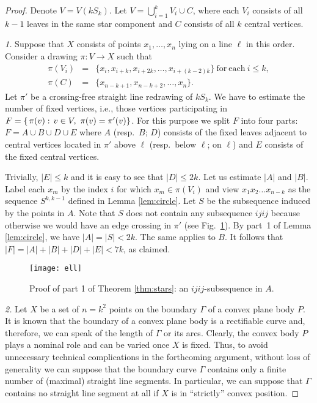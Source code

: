 \documentclass[reqno,12pt]{amsart}
\newcounter{claim}
\newcommand{\function}[2]{:#1 \rightarrow #2}
\begin{document}
\begin{proof}
Denote $V=V(kS_k)$.
Let $V=\bigcup_{i=1}^kV_i\cup C$, where each $V_i$ consists of all $k-1$ leaves
in the same star component and $C$ consists of all $k$ central vertices.

{\sl 1.}
Suppose that $X$ consists of points $x_1,\ldots,x_n$ lying on a line $\ell$ in this order.
Consider a drawing $\pi\function VX$ such that
\begin{equation}\label{eq:pi}
\begin{array}{rcl}
\pi(V_i)&=&\{x_i,x_{i+k},x_{i+2k},\ldots,x_{i+(k-2)k}\}\mathrm{\ for\ each\ }i\le k,\\
\pi(C)&=&\{x_{n-k+1},x_{n-k+2},\ldots,x_n\}.
\end{array}
\end{equation}
Let $\pi'$ be a crossing-free straight line redrawing of $kS_k$.
We have to estimate the number of fixed vertices, i.e., those vertices
participating in 
$F=\{ \hspace{0.5mm} \pi(v) : \hspace{0.5mm} v\in V,\ \pi(v)=\pi'(v)\}$.
For this purpose we split $F$ into four parts: $F=A\cup B\cup D\cup E$ where
$A$ (resp.\ $B$; $D$) consists of the fixed leaves adjacent to central vertices
located in $\pi'$ above $\ell$ (resp.\ below $\ell$; on $\ell$)
and $E$ consists of the fixed central vertices.

Trivially, $|E|\le k$ and it is easy to see that $|D|\le2k$. Let us estimate $|A|$ and $|B|$.
Label each $x_m$ by the index $i$ for which $x_m\in\pi(V_i)$ and view $x_1x_2\ldots x_{n-k}$
as the sequence $S^{k,k-1}$ defined in Lemma \ref{lem:circle}. 
Let $S$ be the subsequence induced by the points in $A$.
Note that $S$ does not contain any subsequence $ijij$ because
otherwise we would have an edge crossing in $\pi'$ (see Fig.~\ref{fig:cross}).
By part~1 of Lemma \ref{lem:circle}, we have $|A|=|S|<2k$. The same applies to $B$.
It follows that $|F|=|A|+|B|+|D|+|E|<7k$, as claimed.



\begin{figure}
\centerline{\texttt{[image: ell]}}
\caption{Proof of part 1 of Theorem \protect\ref{thm:stars}: an $ijij$-subsequence in $A$.}
\label{fig:cross}
\end{figure}


{\sl 2.}
Let $X$ be a set of $n=k^2$ points
on the boundary $\Gamma$ of a convex plane body $P$. 
It is known that the boundary of a convex plane body is a rectifiable curve and,
therefore, we can speak of the length of $\Gamma$ or its arcs.
Clearly, the convex body $P$ plays a nominal role and can be varied once $X$
is fixed.
Thus, to avoid unnecessary technical complications in the forthcoming
argument, without loss of generality we can suppose that the boundary
curve $\Gamma$ contains only a finite number of (maximal) straight line segments.
In particular, we can suppose that $\Gamma$ contains no straight line segment at all
if $X$ is in ``strictly'' convex position.


\end{proof}
\end{document}
